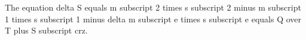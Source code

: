 The equation delta S equals m subscript 2 times s subscript 2 minus m subscript 1 times s subscript 1 minus delta m subscript e times s subscript e equals Q over T plus S subscript crz.